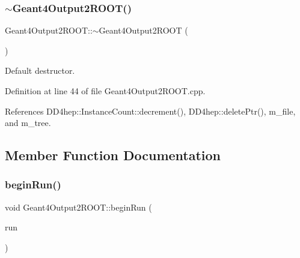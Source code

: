 \hypertarget{class_d_d4hep_1_1_simulation_1_1_geant4_output2_r_o_o_t_a572289de75b5e3a65cb3bda92139cba2}{}\label{class_d_d4hep_1_1_simulation_1_1_geant4_output2_r_o_o_t_a572289de75b5e3a65cb3bda92139cba2} 
\subsubsection{\texorpdfstring{$\sim$\+Geant4\+Output2\+R\+O\+O\+T()}{~Geant4Output2ROOT()}}
{\footnotesize\ttfamily Geant4\+Output2\+R\+O\+O\+T\+::$\sim$\+Geant4\+Output2\+R\+O\+OT (\begin{DoxyParamCaption}{ }\end{DoxyParamCaption})\hspace{0.3cm}{\ttfamily [virtual]}}



Default destructor. 



Definition at line 44 of file Geant4\+Output2\+R\+O\+O\+T.\+cpp.



References D\+D4hep\+::\+Instance\+Count\+::decrement(), D\+D4hep\+::delete\+Ptr(), m\+\_\+file, and m\+\_\+tree.



\subsection{Member Function Documentation}
\hypertarget{class_d_d4hep_1_1_simulation_1_1_geant4_output2_r_o_o_t_a03f3906460b18ff0b31b9c0f9060d93d}{}\label{class_d_d4hep_1_1_simulation_1_1_geant4_output2_r_o_o_t_a03f3906460b18ff0b31b9c0f9060d93d} 
\subsubsection{\texorpdfstring{begin\+Run()}{beginRun()}}
{\footnotesize\ttfamily void Geant4\+Output2\+R\+O\+O\+T\+::begin\+Run (\begin{DoxyParamCaption}\item[{const G4\+Run $\ast$}]{run }\end{DoxyParamCaption})\hspace{0.3cm}{\ttfamily [virtual]}}




